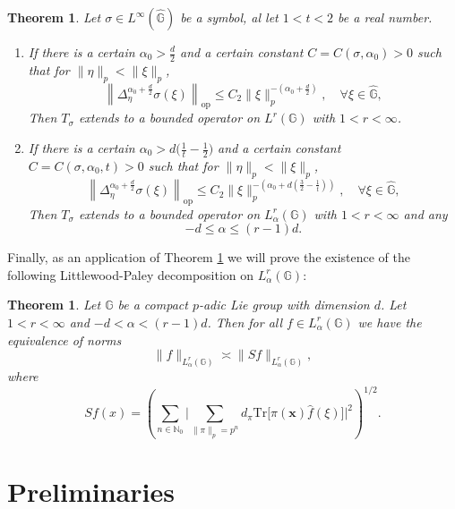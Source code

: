 \documentclass[12pt, reqno]{amsart}
\newtheorem{teo}[defi]{Theorem}
\newcommand{\1}{\mathds{1}}
\newcommand{\G}{\mathbb{G}}
\begin{document}
\begin{teo}\label{TeoMultiplierLr}
Let $\sigma \in L^\infty (\widehat{\G})$ be a symbol, al let $1 <t <2$ be a real number.
\begin{enumerate}
    \item If there is a certain $\alpha_0> \frac{d}{2}$ and a certain constant  $C = C(\sigma,\alpha_0) > 0$ such that for $\|\eta\|_p < \|\xi\|_p$,
    \[
    \left\| \Delta_{\eta}^{\alpha_0 +\frac{ d}{2}} \sigma(\xi) \right\|_{\mathrm{op}} \leq C_2 \|\xi\|_p^{-(\alpha_0+\frac{ d}{2})}, \quad \forall \xi \in \widehat{\mathbb{G}},
    \]Then $T_\sigma$ extends to a bounded operator on $L^r(\G)$ with $1 <r<\infty$.
    \item If there is a certain $\alpha_0> d \big( \frac{1}{t} - \frac{1}{2} \big)$ and a certain constant  $C = C(\sigma,\alpha_0,t) > 0$ such that for $\|\eta\|_p < \|\xi\|_p$,
    \[
    \left\| \Delta_{\eta}^{\alpha_0 +\frac{ d}{2}} \sigma(\xi) \right\|_{\mathrm{op}} \leq C_2 \|\xi\|_p^{-(\alpha_0+d(
    \frac{3}{2}-\frac{1}{t}))}, \quad \forall \xi \in \widehat{\mathbb{G}},
    \]Then $T_\sigma$ extends to a bounded operator on $L^r_\alpha (\G)$ with $1 <r<\infty$ and any $$ -d \leq \alpha \leq (r-1) d.$$
\end{enumerate}
\end{teo}

Finally, as an application of Theorem \ref{TeoMultiplierLr}  we will prove the existence of the following Littlewood-Paley decomposition on $L^r_\alpha(\mathbb{G})$:

\begin{teo}\label{teolittlewood}
Let $\G$ be a compact $p$-adic Lie group with dimension $d$. Let $1<r<\infty$ and $-d < \alpha < (r-1)d$. Then for all $f \in L^r_\alpha(\mathbb{G})$ we have the equivalence of norms
\[
\|f\|_{L^r_\alpha(\mathbb{G})} \asymp \|Sf\|_{L^r_\alpha(\mathbb{G})},
\]
where
\[
Sf(x) = \left( \sum_{n \in \mathbb{N}_0} \Big| \sum_{\| \pi \|_p = p^n} d_\pi \mathrm{Tr}\big[ \pi(\mathbf{x}) \hat{f}(\xi) \big] \Big|^2 \right)^{1/2}.
\]
\end{teo}


\section{Preliminaries}
\end{document}
